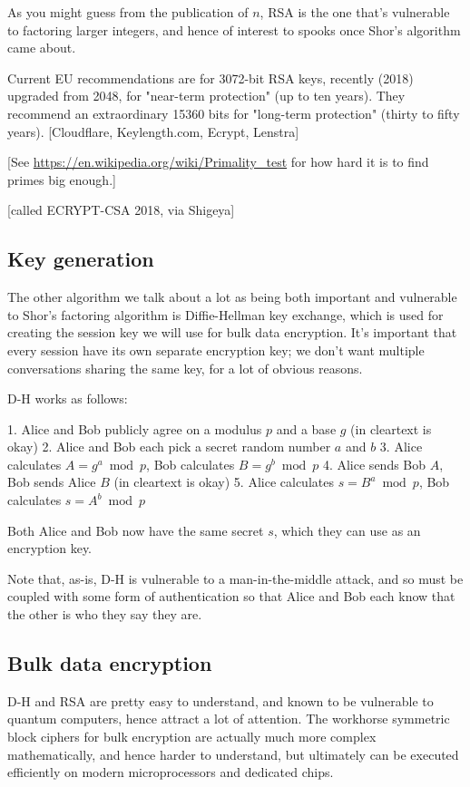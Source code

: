 \documentclass[%
 aip,
 jmp,%
 amsmath,amssymb,
 reprint,%
]{revtex4-1}
\begin{document}
As you might guess from the publication of $n$, RSA is the one that's
vulnerable to factoring larger integers, and hence of interest to
spooks once Shor's algorithm came about.

Current EU recommendations are for 3072-bit RSA keys, recently (2018)
upgraded from 2048, for "near-term protection" (up to ten years).
They recommend an extraordinary 15360 bits for "long-term protection"
(thirty to fifty years). [Cloudflare, Keylength.com, Ecrypt, Lenstra]

[See \url{https://en.wikipedia.org/wiki/Primality_test} for how hard it is
to find primes big enough.]

[called ECRYPT-CSA 2018, via Shigeya]

\subsection{Key generation}

The other algorithm we talk about a lot as being both important and
vulnerable to Shor's factoring algorithm is Diffie-Hellman key
exchange, which is used for creating the session key we will use for
bulk data encryption.  It's important that every session have its own
separate encryption key; we don't want multiple conversations sharing
the same key, for a lot of obvious reasons.

D-H works as follows:

	1. Alice and Bob publicly agree on a modulus $p$ and a base $g$ (in cleartext is okay)
	2. Alice and Bob each pick a secret random number $a$ and $b$
	3. Alice calculates $A = g^a \bmod p$,
	   Bob calculates $B = g^b \bmod p$
	4. Alice sends Bob $A$, Bob sends Alice $B$ (in cleartext is okay)
	5. Alice calculates $s = B^a \bmod p$,
	   Bob calculates $s = A^b \bmod p$

Both Alice and Bob now have the same secret $s$, which they can use as
an encryption key.

Note that, as-is, D-H is vulnerable to a man-in-the-middle attack, and
so must be coupled with some form of authentication so that Alice and
Bob each know that the other is who they say they are.

\subsection{Bulk data encryption}

D-H and RSA are pretty easy to understand, and known to be vulnerable
to quantum computers, hence attract a lot of attention. The workhorse
symmetric block ciphers for bulk encryption are actually much more
complex mathematically, and hence harder to understand, but ultimately
can be executed efficiently on modern microprocessors and dedicated
chips.
\end{document}
